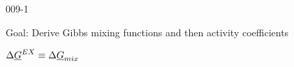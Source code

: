 \begin{mitframe}{009-1}

    
\begin{listone}
        
    \item Goal: Derive Gibbs mixing functions and then activity coefficients
    
    \begin{listtwo}
    \item $\Delta\uline{\gibbs}^{\exfunc} \equiv \Delta\uline{\gibbs}_{\mixfunc}$
    
    
    \end{listtwo}
    
\end{listone}			

\end{mitframe}